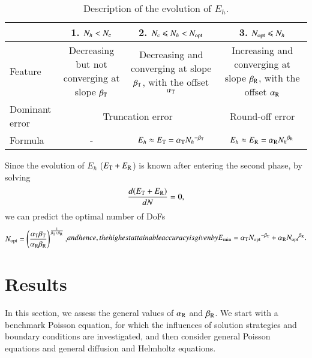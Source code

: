 \documentclass[review,3p]{elsarticle}
\begin{document}
\begin{table}[!ht]
\small
\caption [sss] {Description of the evolution of $E_h$.}
\label{phases_error}
\centering
 \begin{tabular}{|l|c|c|c|} \hline   
 & 1. {$N_h < N_{\rm c}$} & 2. {$N_{\rm c} \leqslant N_h < N_{\rm opt}$} & 3. {$N_{\rm opt} \leqslant N_h$} \\ \hline
Feature & \makecell[l]{Decreasing but not\\ converging at slope $\beta_{\rm T}$} & \makecell[l]{Decreasing and converging\\ at slope $\beta_{\rm T}$, with the offset $\alpha_{\rm T}$} & \makecell[l]{Increasing and converging\\ at slope $\beta_{\rm R}$, with the offset $\alpha_{\rm R}$} \\	\hline
Dominant error & \multicolumn{2}{c|}{Truncation error} & Round-off error \\	\hline
Formula & - & $E_h \approx E_{\rm T}=\alpha_{\rm T}{N_h}^{-\beta_{\rm T}}$ & $E_h \approx E_{\rm R}=\alpha_{\rm R} {N_h}^{\beta _{\rm R}}$ \\	\hline
\end{tabular}
\end{table}

Since the evolution of $E_{h}$ ($E_{\rm T}+E_{\rm R}$) is known after entering the second phase, by solving
\begin{equation}
    \frac{d(E_{\rm T}+E_{\rm R})}{dN}=0,    \label{derivative_condition_N_opt}
\end{equation}
we can predict the optimal number of DoFs
\begin{subequations}
\begin{align}
 N_{\rm opt} = \left( \frac{\alpha_{\rm T} \beta_{\rm T}}{\alpha _{\rm R} \beta_{\rm R}} \right)^{\frac{1}{\beta_{\rm T} + \beta_{\rm R}}},
\end{align}
and hence, the highest attainable accuracy is given by
\begin{align}
 E_{\rm min} = \alpha_{\rm T} {N_{\rm opt}}^{- {\beta _{\rm T}}}+\alpha_{\rm R} {N_{\rm opt}}^{{\beta _{\rm R}}}.
\end{align}
\end{subequations}

\section{Results}  	\label{section_error_constants}

In this section, we assess the general values of $\alpha_{\rm R}$ and $\beta_{\rm R}$.
We start with a benchmark Poisson equation, for which the influences of solution strategies and boundary conditions are investigated, and then consider general Poisson equations and general diffusion and Helmholtz equations. 
\end{document}
